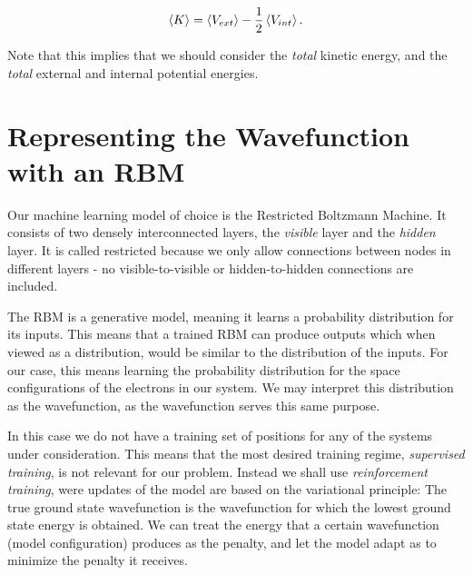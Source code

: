 \documentclass[a4paper, 11pt]{article}
\begin{document}
\begin{multicols}{2}
    \begin{align}
        \expval{K} = \expval{V_{ext}} -
        \frac{1}{2}\expval{V_{int}}.\label{eq:virial-result}
    \end{align}

    Note that this implies that we should consider the \emph{total} kinetic
    energy, and the \emph{total} external and internal potential energies. 

    \section{Representing the Wavefunction with an RBM}

    Our machine learning model of choice is the Restricted Boltzmann Machine. It
    consists of two densely interconnected layers, the \emph{visible} layer
    and the \emph{hidden} layer. It is called restricted because we only
    allow connections between nodes in different layers - no visible-to-visible or
    hidden-to-hidden connections are included.

    The RBM is a generative model, meaning it learns a probability distribution
    for its inputs. This means that a trained RBM can produce outputs which
    when viewed as a distribution, would be similar to the distribution of the
    inputs. For our case, this means learning the probability distribution for
    the space configurations of the electrons in our system. We may interpret
    this distribution as the wavefunction, as the wavefunction serves this same
    purpose.

    In this case we do not have a training set of positions for any of the
    systems under consideration. This means that the most desired training
    regime, \emph{supervised training}, is not relevant for our problem. Instead
    we shall use \emph{reinforcement training}, were updates of the model are
    based on the variational principle: The true ground state wavefunction is
    the wavefunction for which the lowest ground state energy is obtained. We
    can treat the energy that a certain wavefunction (model configuration)
    produces as the penalty, and let the model adapt as to minimize the penalty
    it receives.


\end{multicols}
\end{document}
